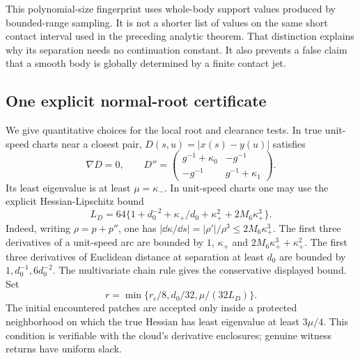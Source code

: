 This polynomial-size fingerprint uses whole-body support values produced
by bounded-range sampling. It is not a shorter list of values on the
same short contact interval used in the preceding analytic theorem.
That distinction explains why its separation needs no continuation
constant. It also prevents a false claim that a smooth body is globally
determined by a finite contact jet.

\subsection{One explicit normal-root certificate}\label{sec:root}
We give quantitative choices for the local root and clearance tests.
In true unit-speed charts near a closest pair, $D(s,u)=|x(s)-y(u)|$
satisfies
\begin{equation}\label{eq:normal-hessian}
 \nabla D=0,\qquad D''=
 \begin{pmatrix}g^{-1}+\kappa_0&-g^{-1}\\
                -g^{-1}&g^{-1}+\kappa_1\end{pmatrix}.
\end{equation}
Its least eigenvalue is at least $\mu=\kappa_-$. In unit-speed charts
one may use the explicit Hessian-Lipschitz bound
\[
 L_D=64\{1+d_0^{-2}+\kappa_+/d_0+\kappa_+^2
                                      +2M_6\kappa_+^3\}.
\]
Indeed, writing $\rho=p+p''$, one has
$|\dd\kappa/\dd s|=|\rho'|/\rho^3\le2M_6\kappa_+^3$.
The first three derivatives of a unit-speed arc are bounded by
$1$, $\kappa_+$ and $2M_6\kappa_+^3+\kappa_+^2$.
The first three derivatives of Euclidean distance at separation at least
$d_0$ are bounded by $1,d_0^{-1},6d_0^{-2}$. The multivariate chain
rule gives the conservative displayed bound.
Set
\begin{equation}\label{eq:root-radius}
 r=\min\{r_c/8,d_0/32,\mu/(32L_D)\}.
\end{equation}
The initial encountered patches are accepted only inside a protected
neighborhood on which the true Hessian has least eigenvalue at least
$3\mu/4$. This condition is verifiable with the cloud's derivative
enclosures; genuine witness returns have uniform slack.

